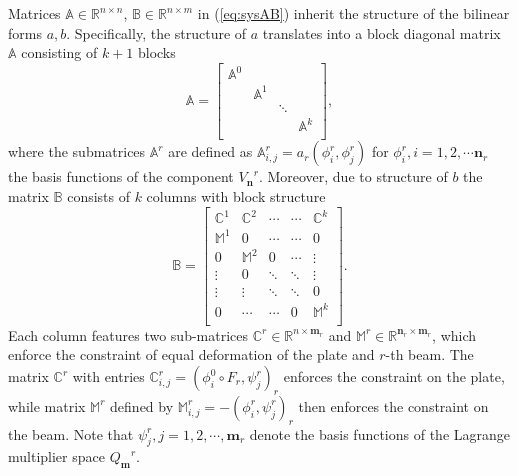 \documentclass{marine_2015}
\newcommand{\Amat}{\ensuremath{\mathbb{A}}}
\newcommand{\Bmat}{\ensuremath{\mathbb{B}}}
\newcommand{\rinner}[2]{\ensuremath{\left(#1, #2\right)_r}}
\newcommand{\arinner}[2]{\ensuremath{a_r\left(#1, #2\right)}}
\newcommand{\Vh}{\ensuremath{V_{\mathbf{n}}}}
\newcommand{\Qh}{\ensuremath{Q_{\mathbf{m}}}}
\begin{document}
Matrices $\Amat\in\mathbb{R}^{n\times n}$, $\Bmat\in\mathbb{R}^{n\times m}$ in
(\ref{eq:sysAB}) inherit the structure of the bilinear forms $a, b$. Specifically, 
the structure of $a$ translates into a block diagonal matrix $\Amat$ consisting of
$k+1$ blocks
\[
    \mathbb{A}=
    \begin{bmatrix}
      \mathbb{A}^0  &   &  &\\
                    & \mathbb{A}^1 &  &\\
                    &   &   \ddots    & \\
                    &   &   & \mathbb{A}^k\\
    \end{bmatrix},
\]
where the submatrices $\mathbb{A}^r$ are defined as $\mathbb{A}^r_{i,
j}=\arinner{\phi^r_i}{\phi^r_j}$ for $\phi^r_i, i=1, 2, \cdots \mathbf{n}_r$ the
basis functions of the component $\Vh^r$. Moreover, due to structure of $b$ the 
matrix $\Bmat$ consists of $k$ columns with block structure
\[
    \mathbb{B}=
    \begin{bmatrix}
      \mathbb{C}^1 & \mathbb{C}^2 & \cdots & \cdots & \mathbb{C}^k\\
      \mathbb{M}^1   &        0       & \cdots & \cdots &        0      \\
           0         & \mathbb{M}^2   &    0   & \cdots &   \vdots      \\
         \vdots      &       0        & \ddots & \ddots &   \vdots      \\
         \vdots      &     \vdots      & \ddots & \ddots &       0      \\
      0         &  \cdots        & \cdots & 0      &   \mathbb{M}^k     \\
    \end{bmatrix}.
\]
Each column features two sub-matrices
$\mathbb{C}^r\in\mathbb{R}^{n\times\mathbf{m}_r}$ and
$\mathbb{M}^r\in\mathbb{R}^{\mathbf{n}_r\times\mathbf{m}_r}$, which enforce the
constraint of equal deformation of the plate and $r$-th beam. The matrix
$\mathbb{C}^r$ with entries $\mathbb{C}^r_{i, j} = \rinner{\phi^0_i\circ F_r}{\psi^r_j}$ 
enforces the constraint on the plate, while matrix $\mathbb{M}^r$ defined by
$\mathbb{M}^r_{i, j}=-\rinner{\phi^r_i}{\psi^r_j}$ then enforces the constraint
on the beam. Note that $\psi^r_j, j=1, 2,\cdots,\mathbf{m}_r$ denote the basis
functions of the Lagrange multiplier space $\Qh^r$.
\end{document}
